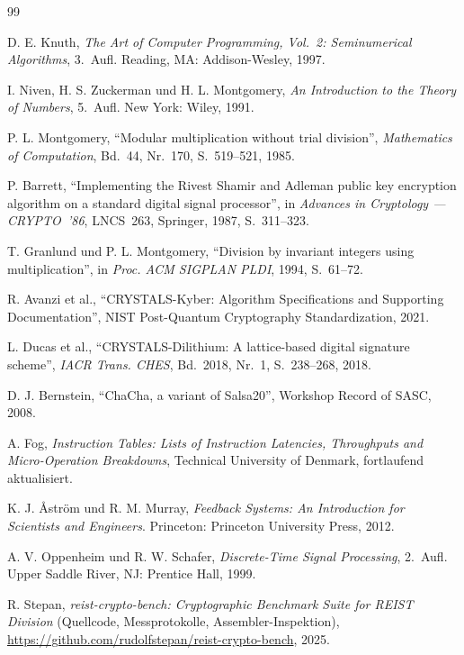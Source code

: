 \documentclass[11pt,a4paper]{scrartcl}
\theoremstyle{definition}
\theoremstyle{plain}
\theoremstyle{remark}
\begin{document}
\begin{thebibliography}{99}

 D. E. Knuth, \emph{The Art of Computer Programming, Vol.~2: Seminumerical Algorithms}, 3.~Aufl. Reading, MA: Addison-Wesley, 1997.

 I. Niven, H. S. Zuckerman und H. L. Montgomery, \emph{An Introduction to the Theory of Numbers}, 5.~Aufl. New York: Wiley, 1991.


 P. L. Montgomery, \enquote{Modular multiplication without trial division}, \emph{Mathematics of Computation}, Bd.~44, Nr.~170, S.~519--521, 1985.

 P. Barrett, \enquote{Implementing the Rivest Shamir and Adleman public key encryption algorithm on a standard digital signal processor}, in \emph{Advances in Cryptology --- CRYPTO~'86}, LNCS~263, Springer, 1987, S.~311--323.

 T. Granlund und P. L. Montgomery, \enquote{Division by invariant integers using multiplication}, in \emph{Proc. ACM SIGPLAN PLDI}, 1994, S.~61--72.

 R. Avanzi et al., \enquote{CRYSTALS-Kyber: Algorithm Specifications and Supporting Documentation}, NIST Post-Quantum Cryptography Standardization, 2021.

 L. Ducas et al., \enquote{CRYSTALS-Dilithium: A lattice-based digital signature scheme}, \emph{IACR Trans. CHES}, Bd.~2018, Nr.~1, S.~238--268, 2018.

 D. J. Bernstein, \enquote{ChaCha, a variant of Salsa20}, Workshop Record of SASC, 2008.

 A. Fog, \emph{Instruction Tables: Lists of Instruction Latencies, Throughputs and Micro-Operation Breakdowns}, Technical University of Denmark, fortlaufend aktualisiert.

 K. J. \AA{}str\"om und R. M. Murray, \emph{Feedback Systems: An Introduction for Scientists and Engineers}. Princeton: Princeton University Press, 2012.

 A. V. Oppenheim und R. W. Schafer, \emph{Discrete-Time Signal Processing}, 2.~Aufl. Upper Saddle River, NJ: Prentice Hall, 1999.

 R. Stepan, \emph{reist-crypto-bench: Cryptographic Benchmark Suite for REIST Division} (Quellcode, Messprotokolle, Assembler-Inspektion), \url{https://github.com/rudolfstepan/reist-crypto-bench}, 2025.


\end{thebibliography}
\end{document}
